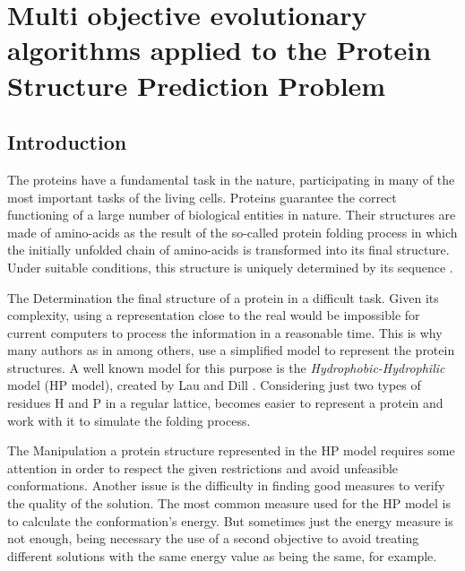 
\chapter{Multi objective evolutionary algorithms applied to the Protein Structure Prediction Problem}


\section{Introduction} \label{sec:intro}


The proteins have a fundamental task in the nature, participating in many of the most important tasks of the living cells. Proteins guarantee the correct functioning of a large number of biological entities in nature. Their structures are made of amino-acids as the result of the so-called protein folding process in which the initially unfolded chain of amino-acids is transformed into its final structure. Under suitable conditions, this structure is uniquely determined by its sequence \cite{santana2004protein}.


The Determination the final structure of a protein in a difficult task. Given its complexity, using a representation close to the real would be impossible for current computers to process the information in a reasonable time. This is why many authors as in \cite{custodio2004investigation, hsu2003growth, krasnogor2002multimeme, lin2011protein, unger1993genetic} among others, use a simplified model to represent the protein structures. A well known model for this purpose is the \textit{Hydrophobic-Hydrophilic} model (HP model), created by Lau and Dill \cite{lau1989lattice}. Considering just two types of residues H and P in a regular lattice, becomes easier to represent a protein and work with it to simulate the folding process.


The Manipulation a protein structure represented in the HP model requires some attention in order to respect the given restrictions and avoid unfeasible conformations. Another issue is the difficulty in finding good measures to verify the quality of the solution. The most common measure used for the HP model is to calculate the conformation's energy. But sometimes just the energy measure is not enough, being necessary the use of a second objective to avoid treating different solutions with the same energy value as being the same, for example.



